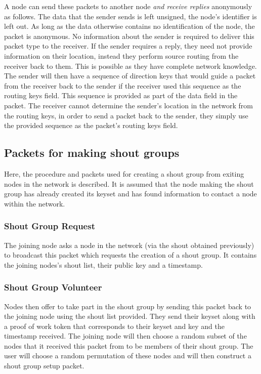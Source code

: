 \documentclass[ %
                    author={Luke Murray},
                supervisor={Dr. Simon Hollis},
                     title={Shadow Peer-to-Peer Networks},
                  subtitle={},
                    degree={MEng},
                      year={2013} ]{thesis}
\begin{document}
A node can send these packets to another node {\em and receive replies} anonymously as follows. The data that the sender sends is left unsigned, the node's identifier is left out. As long as the data otherwise contains no identification of the node, the packet is anonymous. No information about the sender is required to deliver this packet type to the receiver. If the sender requires a reply, they need not provide information on their location, instead they perform source routing from the receiver back to them. This is possible as they have complete network knowledge. The sender will then have a sequence of direction keys that would guide a packet from the receiver back to the sender if the receiver used this sequence as the routing keys field. This sequence is provided as part of the data field in the packet. The receiver cannot determine the sender's location in the network from the routing keys, in order to send a packet back to the sender, they simply use the provided sequence as the packet's routing keys field.

\subsection{Packets for making shout groups}
\label{sec:create_shout_group}

Here, the procedure and packets used for creating a shout group from exiting nodes in the network is described. It is assumed that the node making the shout group has already created its keyset and has found information to contact a node within the network.

\subsubsection{Shout Group Request}

The joining node asks a node in the network (via the shout obtained previously) to broadcast this packet which requests the creation of a shout group. It contains the joining nodes's shout list, their public key and a timestamp.

\subsubsection{Shout Group Volunteer}

Nodes then offer to take part in the shout group by sending this packet back to the joining node using the shout list provided. They send their keyset along with a proof of work token that corresponds to their keyset and key and the timestamp received. The joining node will then choose a random subset of the nodes that it received this packet from to be members of their shout group. The user will choose a random permutation of these nodes and will then construct a shout group setup packet.
\end{document}
